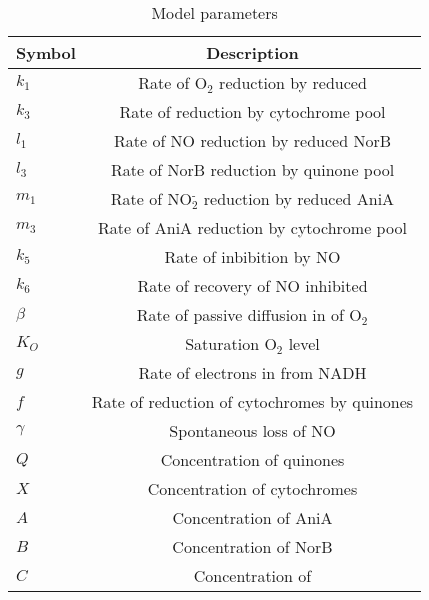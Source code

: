 \begin{table}[ht]
\begin{center}
\caption{Model parameters}
\begin{tabular}{l c}
\toprule
\textbf{Symbol} & \textbf{Description}\\
\midrule
$k_1$ & Rate of O$_{\textrm{2}}$ reduction by reduced \cbbthree{}\\
$k_3$ & Rate of \cbbthree{} reduction by cytochrome pool\\ 
$l_1$ & Rate of NO reduction by reduced NorB\\
$l_3$ & Rate of NorB reduction by quinone pool\\
$m_1$ & Rate of NO$_{\textrm{2}}^{\textrm{-}}$ reduction by reduced AniA\\
$m_3$ & Rate of AniA reduction by cytochrome pool\\
$k_5$ & Rate of \cbbthree{} inbibition by NO\\
$k_6$ & Rate of recovery of NO inhibited \cbbthree{}\\
$\beta$ & Rate of passive diffusion in of O$_{\textrm{2}}$\\
$K_O$ & Saturation O$_{\textrm{2}}$ level\\
$g$ & Rate of electrons in from NADH\\
$f$ & Rate of reduction of cytochromes by quinones\\
$\gamma$ & Spontaneous loss of NO\\
$Q$ & Concentration of quinones\\
$X$ & Concentration of cytochromes\\   
$A$ & Concentration of AniA\\
$B$ & Concentration of NorB\\
$C$ & Concentration of \cbbthree{}\\
\bottomrule
\end{tabular}
\label{ps}
\end{center}
\end{table}